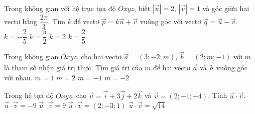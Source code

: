 \begin{ex}%
	Trong không gian với hệ trục tọa độ $Oxyz$, biết $|\overrightarrow{u}|=2$, $|\overrightarrow{v}|=1$ và góc giữa  hai vectơ bằng $\dfrac{2 \pi}{3}$. Tìm $k$ để vectơ $\overrightarrow{p}=k \overrightarrow{u}+\overrightarrow{v}$ vuông góc với vectơ $\overrightarrow{q}=\overrightarrow{u}-\overrightarrow{v}$.
	 \choice
		{$k=-\dfrac{2}{5}$} 
		{$k=\dfrac{5}{2}$} 
		{$k=2$} 
		{\True  $k=\dfrac{2}{5}$}
\end{ex}

\begin{ex}%
	Trong không gian $Oxyz$, cho  hai vectơ $\overrightarrow{a}=(3;-2;m)$, $\overrightarrow{b}=(2;m;-1)$ với $m$ là tham số nhận giá trị thực. Tìm giá tri của $m$ để hai vectơ $\overrightarrow{a}$ và $\overrightarrow{b}$ vuông góc với nhau.
	\choice 
		 {$m=1$}
		 {\True $m=2$}
		 {$m=-1$}
		 {$m=-2$}
\end{ex}

\begin{ex}%
	Trong hệ  tọa độ $Oxyz$, cho $\overrightarrow{u}=\overrightarrow{i}+3\overrightarrow{j}+2\overrightarrow{k}$ và $\overrightarrow{v}=(2;-1;-4)$. Tính $\overrightarrow{u}\cdot\overrightarrow{v}$.
	 \choice
		{\True  $\overrightarrow{u}\cdot \overrightarrow{v}=-9$}
		{$\overrightarrow{u}\cdot\overrightarrow{v}=9$} 
		{$\overrightarrow{u}\cdot\overrightarrow{v}=(2;-3;1)$} 
		{$\overrightarrow{u}\cdot\overrightarrow{v}=\sqrt{14}$} 
\end{ex}

